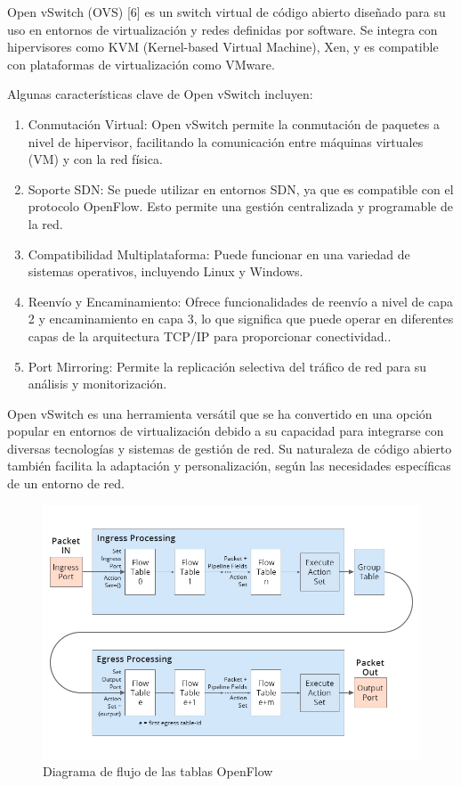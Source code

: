 \documentclass[a4paper, 12pt]{book}
\begin{document}
	Open vSwitch (OVS) [6] es un switch virtual de código abierto diseñado para su uso en entornos de virtualización y redes definidas por software. Se integra con hipervisores como KVM (Kernel-based Virtual Machine), Xen, y es compatible con plataformas de virtualización como VMware.
	
	Algunas características clave de Open vSwitch incluyen:
	
	\begin{enumerate}
		\item Conmutación Virtual: Open vSwitch permite la conmutación de paquetes a nivel de hipervisor, facilitando la comunicación entre máquinas virtuales (VM) y con la red física.
		
		\item Soporte SDN: Se puede utilizar en entornos SDN, ya que es compatible con el protocolo OpenFlow. Esto permite una gestión centralizada y programable de la red.
		
		\item Compatibilidad Multiplataforma: Puede funcionar en una variedad de sistemas operativos, incluyendo Linux y Windows.
		
		\item Reenvío y Encaminamiento: Ofrece funcionalidades de reenvío a nivel de capa 2 y encaminamiento en capa 3, lo que significa que puede operar en diferentes capas de la arquitectura TCP/IP para proporcionar conectividad..
		
		\item Port Mirroring: Permite la replicación selectiva del tráfico de red para su análisis y monitorización.
		
	\end{enumerate}
	
	Open vSwitch es una herramienta versátil que se ha convertido en una opción popular en entornos de virtualización debido a su capacidad para integrarse con diversas tecnologías y sistemas de gestión de red. Su naturaleza de código abierto también facilita la adaptación y personalización, según las necesidades específicas de un entorno de red.
	
	\begin{figure}[H]
		\centering
		\includegraphics[width=14cm, keepaspectratio]{img/DiagramaOpenFlow}
		\caption{Diagrama de flujo de las tablas OpenFlow}
		\label{figura:DiagramaOpenFlow}
	\end{figure}
	
\end{document}
